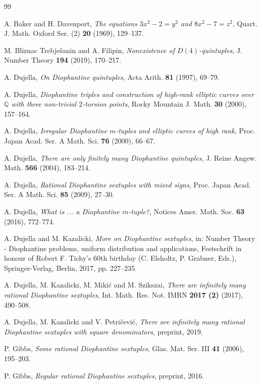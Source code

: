 \documentclass[a4paper]{amsart}
\theoremstyle{plain}
\theoremstyle{definition}
\begin{document}
\begin{thebibliography}{99}

A. Baker and H. Davenport, {\it The equations $3x^2 - 2 = y^2$ and $8x^2 - 7 = z^2$},
Quart. J. Math. Oxford Ser. (2) {\bf 20} (1969), 129--137.

M. Bliznac Trebje\v{s}anin and A. Filipin,
{\it Nonexistence of $D(4)$-quintuples}, J. Number Theory {\bf 194} (2019), 170--217.

A. Dujella,
{\it On Diophantine quintuples}, Acta Arith. {\bf 81} (1997), 69--79.

A. Dujella,
{\it Diophantine triples and construction of high-rank elliptic curves over
$\mathbb{Q}$ with three non-trivial $2$-torsion points},
Rocky Mountain J. Math. {\bf 30} (2000), 157--164.

A. Dujella, {\it Irregular Diophantine $m$-tuples and elliptic curves of high rank},
Proc. Japan Acad. Ser. A Math. Sci. {\bf 76} (2000), 66--67.

A. Dujella, {\it There are only finitely many Diophantine quintuples},
 J. Reine Angew. Math. {\bf 566} (2004), 183--214.

A. Dujella, {\it Rational Diophantine sextuples with mixed signs},
Proc. Japan Acad. Ser. A Math. Sci. {\bf 85} (2009), 27--30.

A. Dujella, {\it What is ... a Diophantine $m$-tuple?}, Notices Amer. Math. Soc. {\bf 63} (2016), 772--774.

A. Dujella and M. Kazalicki, {\it More on Diophantine sextuples}, in: Number Theory - Diophantine problems, uniform distribution and applications, Festschrift in honour of Robert F. Tichy's 60th birthday (C. Elsholtz, P. Grabner, Eds.), Springer-Verlag, Berlin, 2017, pp. 227--235.

A. Dujella, M. Kazalicki, M. Miki\'c and M. Szikszai, {\it There are infinitely many rational
Diophantine sextuples}, Int. Math. Res. Not. IMRN {\bf 2017 (2)} (2017), 490--508.

A. Dujella, M. Kazalicki and V. Petri\v{c}evi\'c,
{\it There are infinitely many rational Diophantine sextuples with square denominators}, preprint, 2019.

P. Gibbs,
{\it Some rational Diophantine sextuples}, Glas. Mat. Ser. III {\bf 41} (2006), 195--203.

P. Gibbs,
{\it Regular rational Diophantine sextuples}, preprint, 2016.


\end{thebibliography}
\end{document}
